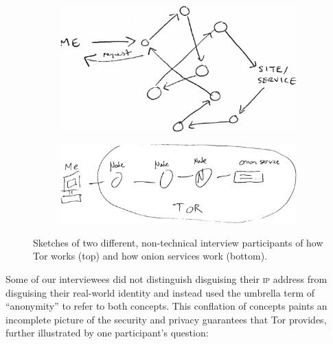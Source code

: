 \begin{figure}[t]
    \centering

    \begin{subfigure}[t]{\linewidth}
        \centering
        \includegraphics[width=0.8\linewidth]{figures/tor-sketch.jpg}
        \label{fig:tor-sketch}
    \end{subfigure}

    \begin{subfigure}[t]{\linewidth}
        \centering
        \includegraphics[width=0.8\linewidth]{figures/os-sketch.jpg}
        \label{fig:os-sketch}
    \end{subfigure}

    \caption{Sketches of two different, non-technical interview participants of
    how Tor works (top) and how onion services work (bottom).}
\end{figure}

Some of our interviewees did not distinguish disguising their \textsc{ip}
address from disguising their real-world identity and instead used the umbrella
term of ``anonymity'' to refer to both concepts.  This conflation of concepts
paints an incomplete picture of the security and privacy guarantees that Tor
provides, further illustrated by one participant's question:

